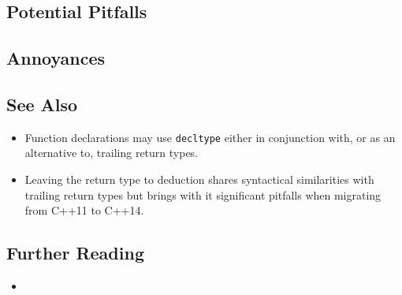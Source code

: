 \subsection[Potential Pitfalls]{Potential Pitfalls}\label{potential-pitfalls}

\hspace{\fill}

\subsection[Annoyances]{Annoyances}\label{annoyances}

\hspace{\fill}

\subsection[See Also]{See Also}\label{see-also}

\begin{itemize}
\item{%
Function declarations may use \lstinline!decltype! either in conjunction with, or as an alternative to, trailing return types.}
\item{%
Leaving the return type to deduction shares syntactical similarities with trailing return types but brings with it significant pitfalls when migrating from C++11 to C++14.}
\end{itemize}

\subsection[Further Reading]{Further Reading}\label{further-reading}

\begin{itemize}
\item{\cite{mertz18}}
\end{itemize}


